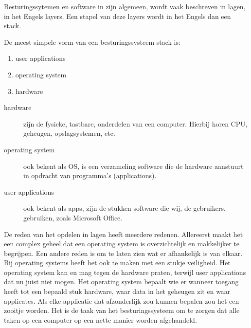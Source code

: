 Besturingssytemen en software in zijn algemeen, wordt vaak beschreven in lagen, in het Engels layers. Een stapel van deze layers wordt in het Engels dan een stack.

De meest simpele vorm van een besturingssysteem stack is:
\begin{enumerate}
\item user applications
\item operating system
\item hardware
\end{enumerate}

\begin{description}
\item[hardware] zijn de fysieke, tastbare, onderdelen van een computer. Hierbij horen CPU, geheugen, opslagsystemen, etc.
\item[operating system] ook bekent als OS, is een verzameling software die de hardware aanstuurt in opdracht van programma's (applications).
\item[user applications] ook bekent als apps, zijn de stukken software die wij, de gebruikers, gebruiken, zoals Microsoft Office.
\end{description}

De reden van het opdelen in lagen heeft meerdere redenen. Allereerst maakt het een complex geheel dat een operating system is overzichtelijk en makkelijker te begrijpen. Een andere reden is om te laten zien wat er afhankelijk is van elkaar. Bij operating systems heeft het ook te maken met een stukje veiligheid. Het operating system kan en mag tegen de hardware praten, terwijl user applications dat nu juist niet mogen. Het operating system bepaalt wie er wanneer toegang heeft tot een bepaald stuk hardware, waar data in het geheugen zit en waar applicates. Als elke applicatie dat afzonderlijk zou kunnen bepalen zou het een zooitje worden. Het is de taak van het besturingssysteem om te zorgen dat alle taken op een computer op een nette manier worden afgehandeld.

